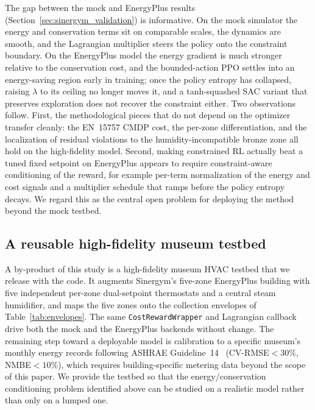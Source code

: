 The gap between the mock and EnergyPlus results
(Section~\ref{sec:sinergym_validation}) is informative. On the mock
simulator the energy and conservation terms sit on comparable scales,
the dynamics are smooth, and the Lagrangian multiplier steers the
policy onto the constraint boundary. On the EnergyPlus model the
energy gradient is much stronger relative to the conservation cost,
and the bounded-action PPO settles into an energy-saving region early
in training; once the policy entropy has collapsed, raising $\lambda$
to its ceiling no longer moves it, and a tanh-squashed SAC variant
that preserves exploration does not recover the constraint either.
Two observations follow. First, the methodological pieces that do not
depend on the optimizer transfer cleanly: the EN~15757 CMDP cost, the
per-zone differentiation, and the localization of residual violations
to the humidity-incompatible bronze zone all hold on the high-fidelity
model. Second, making constrained RL actually beat a tuned fixed
setpoint on EnergyPlus appears to require constraint-aware conditioning
of the reward, for example per-term normalization of the energy and
cost signals and a multiplier schedule that ramps before the policy
entropy decays. We regard this as the central open problem for
deploying the method beyond the mock testbed.

\subsection{A reusable high-fidelity museum testbed}

A by-product of this study is a high-fidelity museum HVAC testbed that
we release with the code. It augments Sinergym's five-zone EnergyPlus
building with five independent per-zone dual-setpoint thermostats and a
central steam humidifier, and maps the five zones onto the collection
envelopes of Table~\ref{tab:envelopes}. The same
\texttt{CostRewardWrapper} and Lagrangian callback drive both the mock
and the EnergyPlus backends without change. The remaining step toward a
deployable model is calibration to a specific museum's monthly energy
records following ASHRAE Guideline~14~\citep{ashrae_guideline14}
(CV-RMSE${<}30\%$, NMBE${<}10\%$), which requires building-specific
metering data beyond the scope of this paper. We provide the testbed so
that the energy/conservation conditioning problem identified above can
be studied on a realistic model rather than only on a lumped one.

